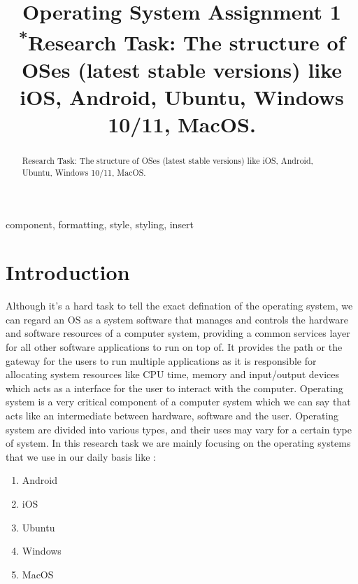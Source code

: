 \documentclass[conference]{IEEEtran}
\begin{document}
\title{Operating System Assignment 1\\
{\footnotesize \textsuperscript{*}Research Task: The structure of OSes (latest stable versions) like iOS, Android, Ubuntu, Windows 10/11, MacOS.}
}

\author{
}

\maketitle

\begin{abstract}
Research Task: The structure of OSes (latest stable versions) like iOS, Android, Ubuntu, Windows 10/11, MacOS.
\end{abstract}

\begin{IEEEkeywords}
component, formatting, style, styling, insert
\end{IEEEkeywords}

\section{Introduction}
Although it's a hard task to tell the exact defination of the operating system, we can regard an OS as a system software that manages and controls the hardware and software resources of a computer system, providing a common services layer for all other software applications to run on top of. It provides the path or the gateway for the users to run multiple applications as it is responsible for allocating system resources like CPU time, memory and input/output devices which acts as a interface for the user to interact with the computer. Operating system is a very critical component of a computer system which we can say that acts like an intermediate between hardware, software and the user. Operating system are divided into various types, and their uses may vary for a certain type of system. In this research task we are mainly focusing on the operating systems that we use in our daily basis like :

\begin{enumerate}
    \item Android
    \item iOS
    \item Ubuntu 
    \item Windows
    \item MacOS
\end{enumerate}
\end{document}
